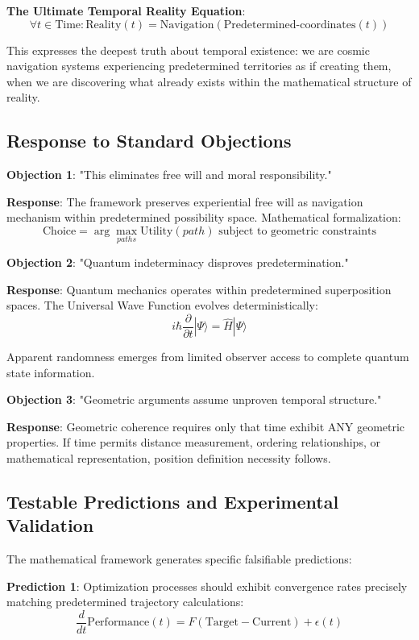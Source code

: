 \documentclass[12pt,a4paper]{article}
\theoremstyle{definition}
\begin{document}
{\textbf{The Ultimate Temporal Reality Equation}:
$$\forall t \in \text{Time}: \text{Reality}(t) = \text{Navigation}(\text{Predetermined-coordinates}(t))$$

This expresses the deepest truth about temporal existence: we are cosmic navigation systems experiencing predetermined territories as if creating them, when we are discovering what already exists within the mathematical structure of reality.

\subsection{Response to Standard Objections}

\textbf{Objection 1}: "This eliminates free will and moral responsibility."

\textbf{Response}: The framework preserves experiential free will as navigation mechanism within predetermined possibility space. Mathematical formalization:
$$\text{Choice} = \arg\max_{paths} \text{Utility}(path) \text{ subject to geometric constraints}$$

\textbf{Objection 2}: "Quantum indeterminacy disproves predetermination."

\textbf{Response}: Quantum mechanics operates within predetermined superposition spaces. The Universal Wave Function evolves deterministically:
$$i\hbar \frac{\partial}{\partial t}|\Psi\rangle = \hat{H}|\Psi\rangle$$

Apparent randomness emerges from limited observer access to complete quantum state information.

\textbf{Objection 3}: "Geometric arguments assume unproven temporal structure."

\textbf{Response}: Geometric coherence requires only that time exhibit ANY geometric properties. If time permits distance measurement, ordering relationships, or mathematical representation, position definition necessity follows.

\subsection{Testable Predictions and Experimental Validation}

The mathematical framework generates specific falsifiable predictions:

\textbf{Prediction 1}: Optimization processes should exhibit convergence rates precisely matching predetermined trajectory calculations:
$$\frac{d}{dt}\text{Performance}(t) = F(\text{Target} - \text{Current}) + \epsilon(t)$$

}
\end{document}
